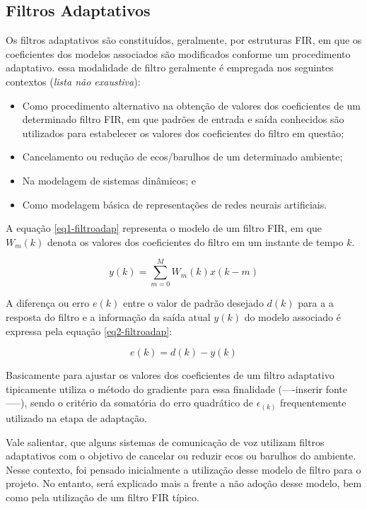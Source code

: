 		
	\subsection{Filtros Adaptativos}
	
		Os filtros adaptativos são constituídos, geralmente, por estruturas FIR, em que os coeficientes dos modelos associados são modificados conforme um procedimento adaptativo. essa modalidade de filtro geralmente é empregada nos seguintes contextos (\textit{lista não exaustiva}):
		
		\begin{itemize}
			\item Como procedimento alternativo na obtenção de valores dos coeficientes de um determinado filtro FIR, em que padrões de entrada e saída conhecidos são utilizados para estabelecer os valores dos coeficientes do filtro em questão;
			\item Cancelamento ou redução de ecos/barulhos de um determinado ambiente;
			\item Na modelagem de sistemas dinâmicos; e
			\item Como modelagem básica de representações de redes neurais artificiais.
		\end{itemize}
	
		A equação \ref{eq1-filtroadap} representa o modelo de um filtro FIR, em que $W_m(k)$ denota os valores dos coeficientes do filtro em um instante de tempo $k$. 
		
		\begin{equation}
			\label{eq1-filtroadap}
			y(k) = \sum_{m=0}^{M} W_m(k)x(k-m)
		\end{equation}
		
		A diferença ou erro $e(k)$ entre o valor de padrão desejado $d(k)$ para a a resposta do filtro e a informação da saída atual $y(k)$ do modelo associado é expressa pela equação \ref{eq2-filtroadap}:
		
		\begin{equation}
			\label{eq2-filtroadap}
			e(k) = d(k)- y(k)
		\end{equation}
		
		Basicamente para ajustar os valores dos coeficientes de um filtro adaptativo tipicamente utiliza o método do gradiente para essa finalidade (----inserir fonte-----), sendo o critério da somatória do erro quadrático de $\epsilon_(k)$ frequentemente utilizado na etapa de adaptação.
		
		Vale salientar, que alguns sistemas de comunicação de voz utilizam filtros adaptativos com o objetivo de cancelar ou reduzir ecos ou barulhos do ambiente. Nesse contexto, foi pensado inicialmente a utilização desse modelo de filtro para o projeto. No entanto, será explicado mais a frente a não adoção desse modelo, bem como pela utilização de um filtro FIR típico.
		
